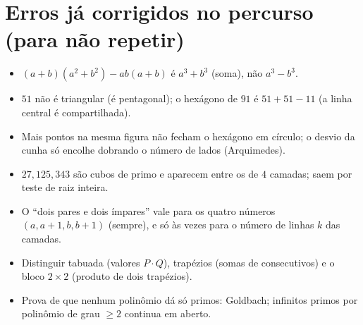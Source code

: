 \documentclass[11pt,a4paper]{article}
\begin{document}
\section{Erros já corrigidos no percurso (para não repetir)}
\begin{itemize}[leftmargin=1.4em]
  \item $(a+b)(a^2+b^2)-ab(a+b)$ é $a^3+b^3$ (soma), não $a^3-b^3$.
  \item $51$ não é triangular (é pentagonal); o hexágono de $91$ é $51+51-11$ (a linha central é compartilhada).
  \item Mais pontos na mesma figura não fecham o hexágono em círculo; o desvio da cunha só encolhe dobrando o número de lados (Arquimedes).
  \item $27,125,343$ são cubos de primo e aparecem entre os de $4$ camadas; saem por teste de raiz inteira.
  \item O ``dois pares e dois ímpares'' vale para os quatro números $(a,a+1,b,b+1)$ (sempre), e só às vezes para o número de linhas $k$ das camadas.
  \item Distinguir tabuada (valores $P\cdot Q$), trapézios (somas de consecutivos) e o bloco $2\times2$ (produto de dois trapézios).
  \item Prova de que nenhum polinômio dá só primos: Goldbach; infinitos primos por polinômio de grau $\ge2$ continua em aberto.
\end{itemize}
\end{document}
